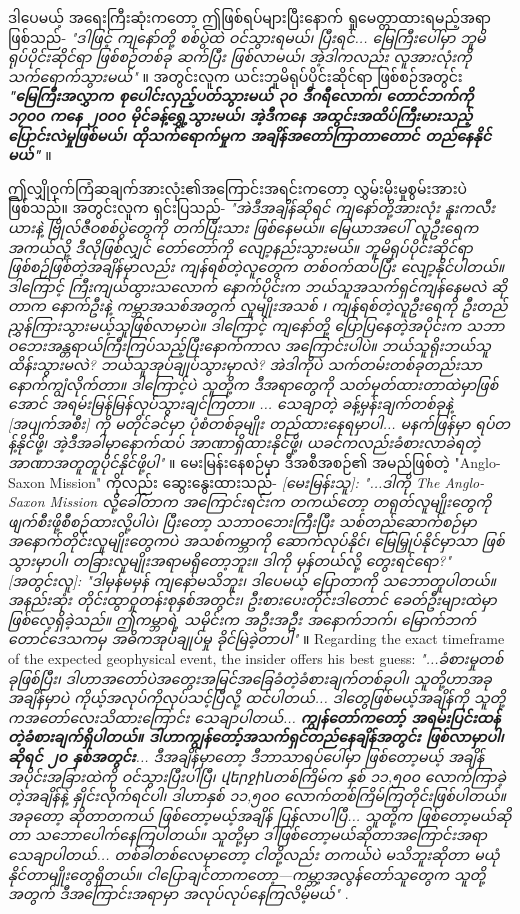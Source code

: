 \documentclass[10pt,twocolumn,letterpaper]{article}
\begin{document}
ဒါပေမယ့် အရေးကြီးဆုံးကတော့ ဤဖြစ်ရပ်များပြီးနောက် ရှုမေတ္တာထားရမည့်အရာဖြစ်သည်- \textit{"ဒါဖြင့် ကျနော်တို့ စစ်ပွဲထဲ ဝင်သွားရမယ်၊ ပြီးရင်... မြေကြီးပေါ်မှာ ဘူမိရုပ်ပိုင်းဆိုင်ရာ ဖြစ်စဉ်တစ်ခု ဆက်ပြီး ဖြစ်လာမယ်၊ အဲ့ဒါကလည်း လူအားလုံးကို သက်ရောက်သွားမယ်"} \cite{4}။ အတွင်းလူက ယင်းဘူမိရုပ်ပိုင်းဆိုင်ရာ ဖြစ်စဉ်အတွင်း \textit{\textbf{"မြေကြီးအလွှာက စုပေါင်းလှည့်ပတ်သွားမယ် ၃၀ ဒီဂရီလောက်၊ တောင်ဘက်ကို ၁၇၀၀ ကနေ ၂၀၀၀ မိုင်ခန့်ရွှေ့သွားမယ်၊ အဲ့ဒီကနေ အထွင်းအထိပ်ကြီးမားသည့် ပြောင်းလဲမှုဖြစ်မယ်၊ ထိုသက်ရောက်မှုက အချိန်အတော်ကြာတာတောင် တည်နေနိုင်မယ်"}} \cite{4}။

ဤလျှိုဝှက်ကြံဆချက်အားလုံး၏အကြောင်းအရင်းကတော့ လွှမ်းမိုးမှုစွမ်းအားပဲ ဖြစ်သည်။ အတွင်းလူက ရှင်းပြသည်- \textit{"အဲဒီအချိန်ဆိုရင် ကျနော်တို့အားလုံး နူးကလီးယားနဲ့ ဗြိုလ်ဇီဝစစ်ပွဲတွေကို တက်ပြီးသား ဖြစ်နေမယ်။ မြေယာအပေါ် လူဦးရေက အကယ်လို့ ဒီလိုဖြစ်လျှင် တော်တော်ကို လျော့နည်းသွားမယ်။ ဘူမိရုပ်ပိုင်းဆိုင်ရာ ဖြစ်စဉ်ဖြစ်တဲ့အချိန်မှာလည်း ကျန်ရစ်တဲ့လူတွေက တစ်ဝက်ထပ်ပြီး လျော့နိုင်ပါတယ်။ ဒါကြောင့် ကြီးကျယ်ထွားသလောက် နောက်ပိုင်းက ဘယ်သူအသက်ရှင်ကျန်နေမလဲ ဆိုတာက နောက်ဦးနဲ့ ကမ္ဘာအသစ်အတွက် လူမျိုးအသစ် ၊ ကျန်ရစ်တဲ့လူဦးရေကို ဦးတည်ညွှန်ကြားသွားမယ့်သူဖြစ်လာမှာပဲ။ ဒါကြောင့် ကျနော်တို့ ပြောပြနေတဲ့အပိုင်းက သဘာဝဘေးအန္တရာယ်ကြီးကြပ်သည့်ပြီးနောက်ကာလ အကြောင်းပါပဲ။ ဘယ်သူရိုးဘယ်သူထိန်းသွားမလဲ? ဘယ်သူအုပ်ချုပ်သွားမှာလဲ? အဲဒါကိုပဲ သက်တမ်းတစ်ခုတည်းသာနောက်ကျွံလိုက်တာ။ ဒါကြောင့်ပဲ သူတို့က ဒီအရာတွေကို သတ်မှတ်ထားတာထဲမှာဖြစ်အောင် အရမ်းမြန်မြန်လုပ်သွားချင်ကြတာ။ ... သေချာတဲ့ ခန့်မှန်းချက်တစ်ခုနဲ့ [အပျက်အစီး] ကို မတိုင်ခင်မှာ ပုံစံတစ်ခုမျိုး တည်ထားနေရမှာပါ... မနက်ဖြန်မှာ ရပ်တန့်နိုင်ဖို့၊ အဲ့ဒီအခါမှာနောက်ထပ် အာဏာရှိထားနိုင်ဖို့၊ ယခင်ကလည်းခံစားလာခဲရတဲ့ အာဏာအတူတူပိုင်နိုင်ဖို့ပါ"} \cite{4}။ မေးမြန်းနေစဉ်မှာ ဒီအစီအစဉ်၏ အမည်ဖြစ်တဲ့ "Anglo-Saxon Mission" ကိုလည်း ဆွေးနွေးထားသည်- \textit{[မေးမြန်းသူ]: "...ဒါကို The Anglo-Saxon Mission လို့ခေါ်တာက အကြောင်းရင်းက တကယ်တော့ တရုတ်လူမျိုးတွေကို ဖျက်စီးဖို့စီစဉ်ထားလို့ပါပဲ၊ ပြီးတော့ သဘာဝဘေးကြီးပြီး သစ်တည်ဆောက်စဉ်မှာ အနောက်တိုင်းလူမျိုးတွေကပဲ အသစ်ကမ္ဘာကို ဆောက်လုပ်နိုင်၊ မြေမြှုပ်နိုင်မှာသာ ဖြစ်သွားမှာပါ၊ တခြားလူမျိုးအရာမရှိတော့ဘူး။ ဒါကို မှန်တယ်လို့ တွေးရင်ရော?" [အတွင်းလူ]: "ဒါမှန်မမှန် ကျနော်မသိဘူး၊ ဒါပေမယ့် ပြောတာကို သဘောတူပါတယ်။ အနည်းဆုံး တိုင်းထွာဝှုတန်းစုနှစ်အတွင်း၊ ဦးစားပေးတိုင်းဒါတောင် ခေတ်ဦးများထဲမှာဖြစ်လေ့ရှိခဲ့သည်။ ဤကမ္ဘာရဲ့ သမိုင်းက အဦးအဦး အနောက်ဘက်၊ မြောက်ဘက်တောင်ဒေသကမှ အဓိကအုပ်ချုပ်မှု ခိုင်မြဲခဲ့တာပါ"} \cite{4}။
Regarding the exact timeframe of the expected geophysical event, the insider offers his best guess: \textit{"...ခံစားမှုတစ်ခုဖြစ်ပြီး၊ ဒါဟာအတော်ပဲအတွေးအမြင်အခြေခံတဲ့ခံစားချက်တစ်ခုပါ၊ သူတို့ဟာအခုအချိန်မှာပဲ ကိုယ့်အလုပ်ကိုလုပ်သင့်ပြီလို့ ထင်ပါတယ်... ဒါတွေဖြစ်မယ့်အချိန်ကို သူတို့ကအတော်လေးသိထားကြောင်း သေချာပါတယ်... \textbf{ကျွန်တော်ကတော့် အရမ်းပြင်းထန်တဲ့ခံစားချက်ရှိပါတယ်။ ဒါဟာကျွန်တော့်အသက်ရှင်တည်နေချိန်အတွင်း ဖြစ်လာမှာပါ၊ ဆိုရင် ၂၀ နှစ်အတွင်း}... ဒီအချိန်မှာတော့ ဒီဘာသာရပ်ပေါ်မှာ ဖြစ်တော့မယ့် အချိန်အပိုင်းအခြားထဲကို ဝင်သွားပြီးပါပြီ၊ վերջինတစ်ကြိမ်က နှစ် ၁၁,၅၀၀ လောက်ကြာခဲ့တဲ့အချိန်နဲ့ နှိုင်းလိုက်ရင်ပါ၊ ဒါဟာနှစ် ၁၁,၅၀၀ လောက်တစ်ကြိမ်ကြတိုင်းဖြစ်ပါတယ်။ အခုတော့ ဆိုတာတကယ် ဖြစ်တော့မယ့်အချိန် ပြန်လာပါပြီ... သူတို့က ဖြစ်တော့မယ်ဆိုတာ သဘောပေါက်နေကြပါတယ်။ သူတို့မှာ ဒါဖြစ်တော့မယ်ဆိုတာအကြောင်းအရာသေချာပါတယ်... တစ်ခါတစ်လေမှာတော့ ငါတို့လည်း တကယ်ပဲ မသိဘူးဆိုတာ မယုံနိုင်တာမျိုးတွေရှိတယ်။ ငါပြောချင်တာကတော့—ကမ္ဘာ့အလွန်တော်သူတွေက သူတို့အတွက် ဒီအကြောင်းအရာမှာ အလုပ်လုပ်နေကြလိမ့်မယ်"} \cite{4}.
\end{document}
